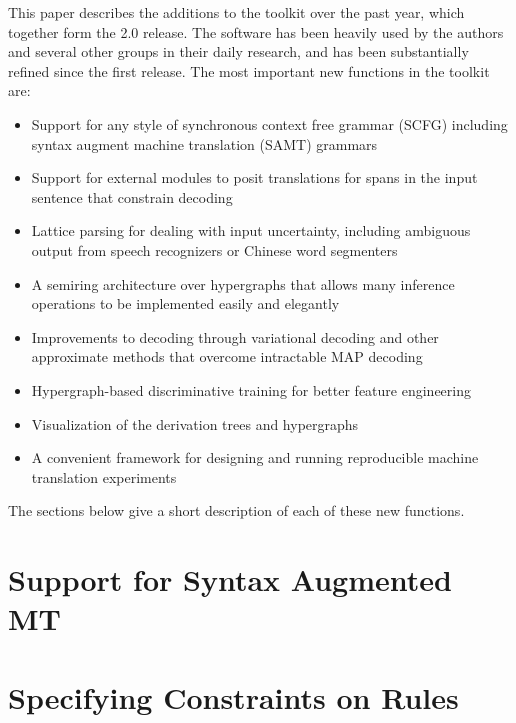 \documentclass[11pt]{article}
\begin{document}
This paper describes the additions to the toolkit over the past year, which together form the 2.0 release. The software has been heavily used by the authors and several other groups in their daily research, and has been substantially refined since the first release.  The most important new functions in the toolkit are: 
\begin{itemize}
\item
Support for any style of synchronous context free grammar (SCFG)
including syntax augment machine translation (SAMT) grammars \cite{samt2006}
\item
Support for external modules to posit translations for spans in the input sentence that constrain decoding   \cite{PBML-2010-Joshua-transliteration}
\item
Lattice parsing for dealing with input uncertainty, including ambiguous output from speech recognizers or Chinese word segmenters  \cite{dyer-muresan-resnik:2008:ACLMain}
\item
A semiring architecture over hypergraphs that allows many inference operations to be implemented easily and elegantly \cite{li-eisner:2009:EMNLP}
\item
Improvements to decoding through variational decoding and other approximate methods that overcome intractable MAP decoding \cite{variational-decoding-acl09}
\item
Hypergraph-based discriminative training for better feature engineering \cite{zhifei-forest-reranking-galebook}
\item
Visualization of the derivation trees and hypergraphs \cite{PBML-2010-Joshua-visualization}
\item
A convenient framework for designing and running reproducible machine translation experiments \cite{Schwartz-wmt10-pipline}
\end{itemize}
The sections below give a short description of each of these new functions.


\section{Support for Syntax Augmented MT}


\section{Specifying Constraints on Rules}
\end{document}
